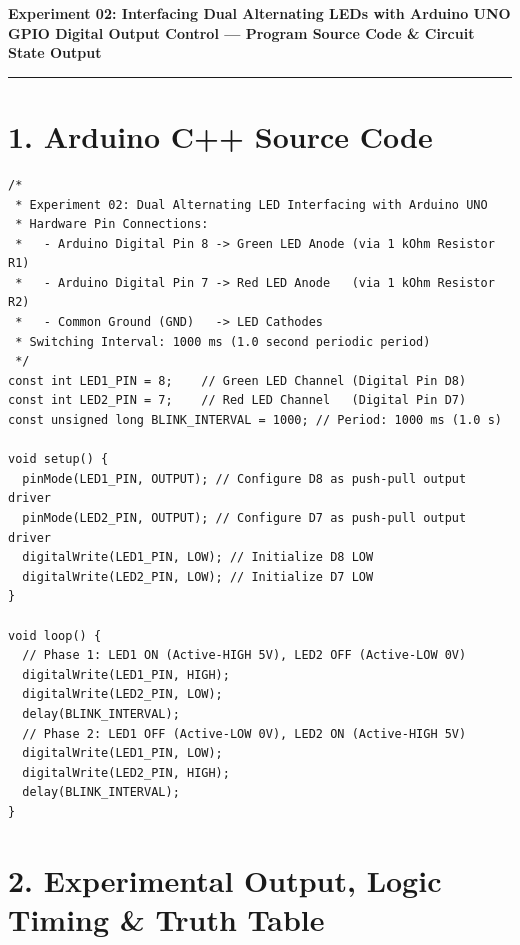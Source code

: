 \documentclass[10pt,a4paper]{article}
\begin{document}
\newpage

\begin{center}
    {\Large\bfseries Experiment 02: Interfacing Dual Alternating LEDs with Arduino UNO}\\[0.10cm]
    {\normalsize\textbf{GPIO Digital Output Control --- Program Source Code \& Circuit State Output}}
\end{center}
\vspace{-0.20cm}
\rule{\textwidth}{0.9pt}
\vspace{0.06cm}

\section*{1. Arduino C++ Source Code}
\begin{lstlisting}[style=bwCode, title={\textbf{Listing 2.1: Microcontroller Firmware for Periodic Anti-Phase LED Blinking.}}]
/*
 * Experiment 02: Dual Alternating LED Interfacing with Arduino UNO
 * Hardware Pin Connections:
 *   - Arduino Digital Pin 8 -> Green LED Anode (via 1 kOhm Resistor R1)
 *   - Arduino Digital Pin 7 -> Red LED Anode   (via 1 kOhm Resistor R2)
 *   - Common Ground (GND)   -> LED Cathodes
 * Switching Interval: 1000 ms (1.0 second periodic period)
 */
const int LED1_PIN = 8;    // Green LED Channel (Digital Pin D8)
const int LED2_PIN = 7;    // Red LED Channel   (Digital Pin D7)
const unsigned long BLINK_INTERVAL = 1000; // Period: 1000 ms (1.0 s)

void setup() {
  pinMode(LED1_PIN, OUTPUT); // Configure D8 as push-pull output driver
  pinMode(LED2_PIN, OUTPUT); // Configure D7 as push-pull output driver
  digitalWrite(LED1_PIN, LOW); // Initialize D8 LOW
  digitalWrite(LED2_PIN, LOW); // Initialize D7 LOW
}

void loop() {
  // Phase 1: LED1 ON (Active-HIGH 5V), LED2 OFF (Active-LOW 0V)
  digitalWrite(LED1_PIN, HIGH);
  digitalWrite(LED2_PIN, LOW);
  delay(BLINK_INTERVAL);
  // Phase 2: LED1 OFF (Active-LOW 0V), LED2 ON (Active-HIGH 5V)
  digitalWrite(LED1_PIN, LOW);
  digitalWrite(LED2_PIN, HIGH);
  delay(BLINK_INTERVAL);
}
\end{lstlisting}

\vspace{0.06cm}
\section*{2. Experimental Output, Logic Timing \& Truth Table}
\end{document}
